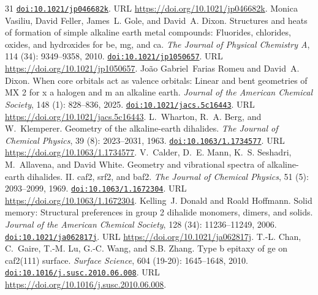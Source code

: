 \documentclass[11pt,a4paper]{article}
\theoremstyle{plain}
\theoremstyle{definition}
\theoremstyle{remark}
\providecommand{\doi}[1]{\href{https://doi.org/#1}{\texttt{doi:#1}}}
\begin{document}
\begin{thebibliography}{31}
\newblock \doi{10.1021/jp046682k}.
\newblock URL \url{https://doi.org/10.1021/jp046682k}.
Monica Vasiliu, David Feller, James~L. Gole, and David~A. Dixon.
\newblock Structures and heats of formation of simple alkaline earth metal
  compounds: Fluorides, chlorides, oxides, and hydroxides for be, mg, and ca.
\newblock \emph{The Journal of Physical Chemistry A}, 114
  (34): 9349--9358, 2010.
\newblock \doi{10.1021/jp1050657}.
\newblock URL \url{https://doi.org/10.1021/jp1050657}.
João Gabriel~Farias Romeu and David~A. Dixon.
\newblock When core orbitals act as valence orbitals: Linear and bent
  geometries of {MX} 2 for x a halogen and m an alkaline earth.
\newblock \emph{Journal of the American Chemical Society}, 148
  (1): 828--836, 2025.
\newblock \doi{10.1021/jacs.5c16443}.
\newblock URL \url{https://doi.org/10.1021/jacs.5c16443}.
L.~Wharton, R.~A. Berg, and W.~Klemperer.
\newblock Geometry of the alkaline-earth dihalides.
\newblock \emph{The Journal of Chemical Physics}, 39 (8):
  2023--2031, 1963.
\newblock \doi{10.1063/1.1734577}.
\newblock URL \url{https://doi.org/10.1063/1.1734577}.
V.~Calder, D.~E. Mann, K.~S. Seshadri, M.~Allavena, and David White.
\newblock Geometry and vibrational spectra of alkaline-earth dihalides. {II}.
  caf2, srf2, and baf2.
\newblock \emph{The Journal of Chemical Physics}, 51 (5):
  2093--2099, 1969.
\newblock \doi{10.1063/1.1672304}.
\newblock URL \url{https://doi.org/10.1063/1.1672304}.
Kelling~J. Donald and Roald Hoffmann.
\newblock Solid memory: Structural preferences in group 2 dihalide monomers,
  dimers, and solids.
\newblock \emph{Journal of the American Chemical Society}, 128
  (34): 11236--11249, 2006.
\newblock \doi{10.1021/ja062817j}.
\newblock URL \url{https://doi.org/10.1021/ja062817j}.
T.-L. Chan, C.~Gaire, T.-M. Lu, G.-C. Wang, and S.B. Zhang.
\newblock Type b epitaxy of ge on caf2(111) surface.
\newblock \emph{Surface Science}, 604 (19-20): 1645--1648,
  2010.
\newblock \doi{10.1016/j.susc.2010.06.008}.
\newblock URL \url{https://doi.org/10.1016/j.susc.2010.06.008}.
\end{thebibliography}
\end{document}
